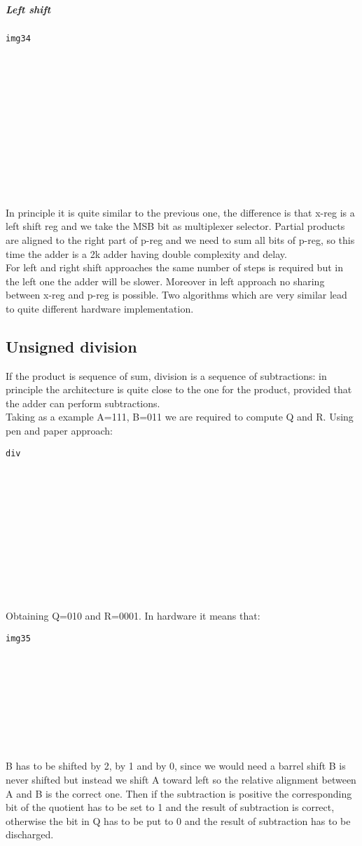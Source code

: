 \subparagraph{Left shift}
\begin{verbatim}
img34














\end{verbatim}

In principle it is quite similar to the previous one, the difference is that x-reg is a left shift reg and we take the MSB bit as multiplexer selector. Partial products are aligned to the right part of p-reg and we need to sum all bits of p-reg, so this time the adder is a 2k adder having double complexity and delay.\\

For left and right shift approaches the same number of steps is required but in the left one the adder will be slower. Moreover in left approach no sharing between x-reg and p-reg is possible. Two algorithms which are very similar lead to quite different hardware implementation.


\subsection{Unsigned division}
If the product is sequence of sum, division is a sequence of subtractions: in principle the architecture is quite close to the one for the product, provided that the adder can perform subtractions.\\

Taking as a example A=111, B=011 we are required to compute Q and R. Using pen and paper approach:

\begin{verbatim}
div













\end{verbatim}

Obtaining Q=010 and R=0001. In hardware it means that:
\begin{verbatim}
img35










\end{verbatim}
B has to be shifted by 2, by 1 and by 0, since we would need a barrel shift B is never shifted but instead we shift A toward left so the relative alignment between A and B is the correct one. Then if the subtraction is positive the corresponding bit of the quotient has to be set to 1 and the result of subtraction is correct, otherwise the bit in Q has to be put to 0 and the result of subtraction has to be discharged.


